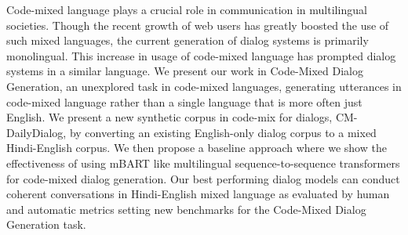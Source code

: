 Code-mixed language plays a crucial role in communication in multilingual societies. Though the recent growth of web users has greatly boosted the use of such mixed languages, the current generation of dialog systems is primarily monolingual. This increase in usage of code-mixed language has prompted dialog systems in a similar language. We present our work in Code-Mixed Dialog Generation, an unexplored task in code-mixed languages, generating utterances in code-mixed language rather than a single language that is more often just English. We present a new synthetic corpus in code-mix for dialogs, CM-DailyDialog, by converting an existing English-only dialog corpus to a mixed Hindi-English corpus. We then propose a baseline approach where we show the effectiveness of using mBART like multilingual sequence-to-sequence transformers for code-mixed dialog generation. Our best performing dialog models can conduct coherent conversations in Hindi-English mixed language as evaluated by human and automatic metrics setting new benchmarks for the Code-Mixed Dialog Generation task.
